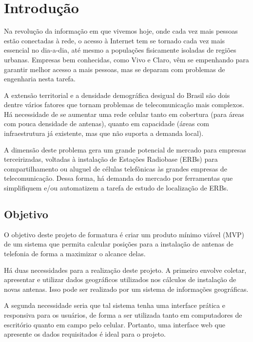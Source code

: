 \documentclass[]{politex}
\begin{document}
\sumario




\chapter{Introdução}

Na revolução da informação em que vivemos hoje, onde cada vez mais pessoas
estão conectadas à rede, o acesso à Internet tem se tornado cada vez mais
essencial no dia-a-dia, até mesmo a populações fisicamente isoladas de regiões
urbanas. Empresas bem conhecidas, como Vivo e Claro, vêm se empenhando para
garantir melhor acesso a mais pessoas, mas se deparam com problemas de
engenharia nesta tarefa.

A extensão territorial e a densidade demográfica desigual do Brasil são dois
dentre vários fatores que tornam problemas de telecomunicação mais complexos.
Há necessidade de se aumentar uma rede celular tanto em cobertura (para áreas
com pouca densidade de antenas), quanto em capacidade (áreas com infraestrutura
já existente, mas que não suporta a demanda local).

A dimensão deste problema gera um grande potencial de mercado para empresas
terceirizadas, voltadas à instalação de Estações Radiobase (ERBs) para
compartilhamento ou aluguel de células telefônicas às grandes empresas de
telecomunicação. Dessa forma, há demanda do mercado por ferramentas que
simplifiquem e/ou automatizem a tarefa de estudo de localização de ERBs.

\section{Objetivo}

O objetivo deste projeto de formatura é criar um produto mínimo viável (MVP) de
um sistema que permita calcular posições para a instalação de antenas de
telefonia de forma a maximizar o alcance delas.

Há duas necessidades para a realização deste projeto. A primeiro envolve
coletar, apresentar e utilizar dados geográficos utilizados nos cálculos
de instalação de novas antenas. Isso pode ser realizado por um sistema de
informações geográficas.

A segunda necessidade seria que tal sistema tenha uma interface prática e
responsiva para os usuários, de forma a ser utilizada tanto em computadores de
escritório quanto em campo pelo celular. Portanto, uma interface web que
apresente os dados requisitados é ideal para o projeto.
\end{document}
